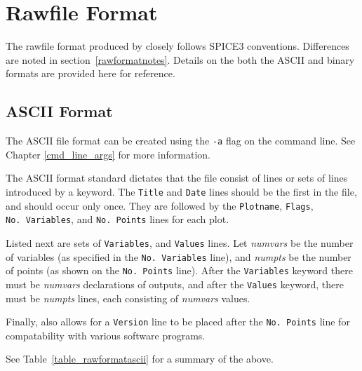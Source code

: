 


\chapter{Rawfile Format}
\label{rawformat}

The rawfile format produced by \Xyce{} closely follows SPICE3
conventions.  Differences are noted in section~\ref{rawformatnotes}. 
Details on the both the ASCII and binary formats are provided here for
reference. 


\section{ASCII Format}
\label{rawformatascii}

The ASCII file format can be created using the \texttt{-a} flag on the command
line. See Chapter \ref{cmd_line_args} for more information.

The ASCII format standard dictates that the file consist of lines or sets of
lines introduced by a keyword. The \texttt{Title} and \texttt{Date} lines
should be the first in the file, and should occur only once. They are followed
by the \texttt{Plotname}, \texttt{Flags}, \texttt{No.~Variables}, and
\texttt{No.~Points} lines for each plot. 

Listed next are sets of \texttt{Variables}, and \texttt{Values} lines. Let
\emph{numvars} be the number of variables (as specified in the
\texttt{No.~Variables} line), and \emph{numpts} be the number of points (as
shown on the \texttt{No.~Points} line). After the \texttt{Variables} keyword
there must be \emph{numvars} declarations of outputs, and after the
\texttt{Values} keyword, there must be \emph{numpts} lines, each consisting of
\emph{numvars} values. 

Finally, \Xyce{} also allows for a \texttt{Version} line to be placed after the
\texttt{No.~Points} line for compatability with various software programs.

See Table~\ref{table_rawformatascii} for a summary of the above.

